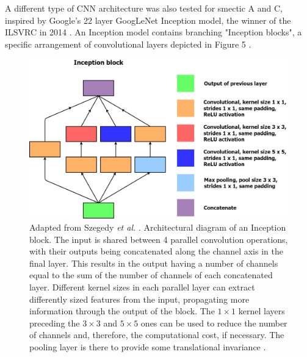 \documentclass[12pt]{article}
\begin{document}
A different type of CNN architecture was also tested for smectic A and C, inspired by Google's 22 layer GoogLeNet Inception model, the winner of the ILSVRC in 2014 \cite{ILSVRC15}. An Inception model contains branching "Inception blocks", a specific arrangement of convolutional layers depicted in Figure 5 \cite{Szegedy2015}.  
\begin{figure}[!ht]
\centering
\includegraphics[width=5in]{images/inception_block.png}
\caption{Adapted from Szegedy \textit{et al.} \cite{Szegedy2015}. Architectural diagram of an Inception block. The input is shared between 4 parallel convolution operations, with their outputs being concatenated along the channel axis in the final layer. This results in the output having a number of channels equal to the sum of the number of channels of each concatenated layer. Different kernel sizes in each parallel layer can extract differently sized features from the input, propagating more information through the output of the block. The $1 \times 1$ kernel layers preceding the $3 \times 3$ and $5 \times 5$ ones can be used to reduce the number of channels and, therefore, the computational cost, if necessary. The pooling layer is there to provide some translational invariance \cite{Szegedy2015}.}
\end{figure}
\end{document}
